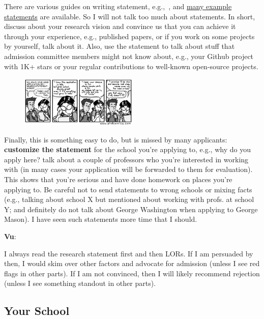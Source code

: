 \documentclass[11pt]{article}
\newenvironment{commentbox}[1][]{
\small
    \begin{cbox}
    \textbf{#1}: 
 }{
   \end{cbox}
}
\begin{document}
There are various guides on writing statement, e.g.,~\cite{blattman2022writing}, and \href{https://cs-sop.org/}{many example statements} are available. So I will not talk too much about statements. In short, discuss about your research vision and convince us that you can achieve it through your experience, e.g., published papers, or if you work on some projects by yourself, talk about it. Also, use the statement to talk about stuff that admission committee members might not know about, e.g., your Github project with 1K+ stars or  your regular contributions to well-known open-source projects.

\begin{figure}
\vspace{-0.4in}
  \begin{center}
    \includegraphics[width=0.50\textwidth]{c2.png}
  \end{center}
\vspace{-0.4in}  
\end{figure}
Finally, this is something easy to do, but is missed by many
applicants: \textbf{customize the statement} for the school you're applying to,
e.g., why do you apply here? talk about a couple of professors who you're interested in working with (in many cases your application will be forwarded to them for evaluation).
This shows that you're serious and have done homework on places you're applying to.
Be careful not to send statements to wrong schools or mixing
facts (e.g., talking about school X but mentioned about working with
profs. at school Y; and definitely do not talk about George Washington when applying to George Mason). I have seen such statements more time that I
should.


\begin{commentbox}[Vu]
I always read the research statement first and then LORs. If I am
persuaded by then, I would skim over other factors and advocate for
admission (unless I see red flags in other parts). If I am not
convinced, then I will likely recommend rejection (unless I see
something standout in other parts).
\end{commentbox}


\subsection{Your School}\label{sec:your-school}
\end{document}
